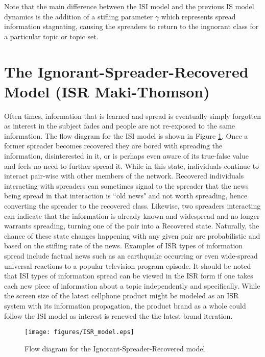 \noindent Note that the main difference between the ISI model and the previous IS model dynamics is the addition of a stifling parameter $\gamma$ which represents spread information stagnating, causing the spreaders to return to the ingnorant class for a particular topic or topic set.


\section{The Ignorant-Spreader-Recovered Model (ISR Maki-Thomson)}
Often times, information that is learned and spread is eventually simply forgotten as interest in the subject fades and people are not re-exposed to the same information. The flow diagram for the ISI model is shown in Figure \ref{fig:ISR_model}. Once a former spreader becomes recovered they are bored with spreading the information, disinterested in it, or is perhaps even aware of its true-false value and feels no need to further spread it. While in this state, individuals continue to interact pair-wise with other members of the network. Recovered individuals interacting with spreaders can sometimes signal to the spreader that the news being spread in that interaction is ``old news" and not worth spreading, hence converting the spreader to the recovered class. Likewise, two spreaders interacting can indicate that the information is already known and widespread and no longer warrants spreading, turning one of the pair into a Recovered state. Naturally, the chance of these state changes happening with any given pair are probabilistic and based on the stifling rate of the news. Examples of ISR types of information spread include factual news such as an earthquake occurring or even wide-spread universal reactions to a popular television program episode. It should be noted that ISI types of information spread can be viewed in the ISR form if one takes each new piece of information about a topic independently and specifically. While the screen size of the latest cellphone product might be modeled as an ISR system with its information propagation, the product brand as a whole could follow the ISI model as interest is renewed the the latest brand iteration. 

\begin{figure}[!htbp] \centering
  \texttt{[image: figures/ISR\_model.eps]}
  \caption{Flow diagram for the Ignorant-Spreader-Recovered model}
  \label{fig:ISR_model}
\end{figure}

